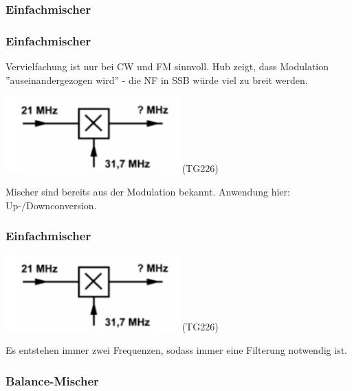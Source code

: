 \subsubsection{Einfachmischer}

\begin{frame}
    \frametitle{Einfachmischer}

    Vervielfachung ist nur bei CW und FM sinnvoll. Hub zeigt, dass Modulation
    ''auseinandergezogen wird'' - die NF in SSB würde viel zu breit werden.

    \begin{center}
        \includegraphics[width=0.5\textwidth]{a13/TG226.png}
        \tiny (TG226)
    \end{center}

    Mischer sind bereits aus der Modulation bekannt. Anwendung hier:
    Up-/Downconversion.
    

\end{frame}

\begin{frame}
    \frametitle{Einfachmischer}

    \begin{center}
        \includegraphics[width=0.5\textwidth]{a13/TG226.png}
        \tiny (TG226)
    \end{center}

    Es entstehen immer zwei Frequenzen, sodass immer eine Filterung notwendig
    ist.

\end{frame}

\subsubsection{Balance-Mischer}

